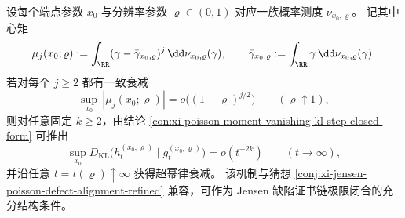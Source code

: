 \begin{conjecture}[共动端点谱混合的全阶矩熄灭与超幂律证书]\label{conj:xi-poisson-comoving-endpoint-all-moments-extinguish}
设每个端点参数 \(x_0\) 与分辨率参数 \(\varrho\in(0,1)\) 对应一族概率测度
\(
\nu_{x_0,\varrho}
\)。
记其中心矩
\[
\mu_j(x_0;\varrho)
:=\int_{\RR}(\gamma-\bar\gamma_{x_0,\varrho})^j\,\dd\nu_{x_0,\varrho}(\gamma),
\qquad
\bar\gamma_{x_0,\varrho}:=\int_{\RR}\gamma\,\dd\nu_{x_0,\varrho}(\gamma).
\]
若对每个 \(j\ge2\) 都有一致衰减
\[
\sup_{x_0}\,|\mu_j(x_0;\varrho)|
=o\!\bigl((1-\varrho)^{j/2}\bigr)
\qquad(\varrho\uparrow1),
\]
则对任意固定 \(k\ge2\)，由结论
\ref{con:xi-poisson-moment-vanishing-kl-step-closed-form}
可推出
\[
\sup_{x_0}
D_{\mathrm{KL}}\!\bigl(h_t^{(x_0,\varrho)}\mid g_t^{(x_0,\varrho)}\bigr)
=o(t^{-2k})\qquad(t\to\infty),
\]
并沿任意 \(t=t(\varrho)\uparrow\infty\) 获得超幂律衰减。
该机制与猜想 \ref{conj:xi-jensen-poisson-defect-alignment-refined}
兼容，可作为 Jensen 缺陷证书链极限闭合的充分结构条件。
\end{conjecture}

\endinput
